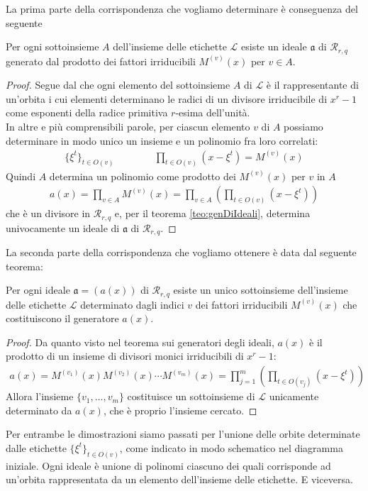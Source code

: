 \vspace{0.6cm}

\noindent
La prima parte della corrispondenza che vogliamo determinare è conseguenza del seguente
\begin{teorema}\label{teo:corrispEtiIde1}
   Per ogni sottoinsieme $A$ dell'insieme delle etichette $\mathscr{L}$ esiste un ideale $\mathfrak{a}$ di $\mathcal{R}_{r,q}$ generato dal prodotto dei fattori irriducibili $M^{(v)}(x)$ per $v\in A$.
\end{teorema}
\begin{proof}
   Segue dal che ogni elemento del sottoinsieme $A$ di $\mathscr{L}$ è il rappresentante di un'orbita i cui elementi determinano le radici di un divisore irriducibile di $x^r - 1$ come esponenti della radice primitiva $r$-esima dell'unità.\\
   In altre e più comprensibili parole, per ciascun elemento $v$ di $A$ possiamo determinare in modo unico un insieme e un polinomio fra loro correlati:
   \begin{align*}
      \lbrace \xi^{t} \rbrace_{t \in O(v)} \qquad \qquad \prod_{t \in O(v)} (x - \xi^{t}) = M^{(v)}(x)
   \end{align*}
   Quindi $A$ determina un polinomio come prodotto dei $M^{(v)}(x)$ per $v$ in $A$
   \begin{align*}
      a(x) = \prod_{v\in A} M^{(v)}(x) = \prod_{v\in A} (  \prod_{t \in O(v)} (x - \xi^{t}) )
   \end{align*}
   che è un divisore in $\mathcal{R}_{r,q} $ e, per il teorema \ref{teo:genDiIdeali}, determina univocamente un ideale di $\mathfrak{a}$ di $\mathcal{R}_{r,q}$. 
\end{proof}
\noindent
La seconda parte della corrispondenza che vogliamo ottenere è data dal seguente teorema:
\begin{teorema}\label{teo:corrispEtiIde2}
   Per ogni ideale $\mathfrak{a} = (a(x))$ di $\mathcal{R}_{r,q}$ esiste un unico sottoinsieme dell'insieme delle etichette $\mathscr{L}$ determinato dagli indici $v$ dei fattori irriducibili $M^{(v)}(x)$ che costituiscono il generatore $a(x)$.
\end{teorema}
\begin{proof}
   Da quanto visto nel teorema sui generatori degli ideali, $a(x)$ è il prodotto di un insieme di divisori monici irriducibili di $x^r - 1$:
   \begin{align*}
      a(x) =  M^{(v_{1})}(x) M^{(v_{2})}(x) \cdots M^{(v_{m})}(x) = \prod_{j=1}^{m} (  \prod_{t \in O(v_{j})} (x - \xi^{t}) )
   \end{align*}
   Allora l'insieme $ \lbrace v_{1}, \dots , v_{m} \rbrace$ costituisce un sottoinsieme di $\mathscr{L}$ unicamente determinato da $a(x) $, che è proprio l'insieme cercato.
\end{proof}
\noindent
Per entrambe le dimostrazioni siamo passati per l'unione delle orbite determinate dalle etichette $\lbrace \xi^{t} \rbrace_{t \in O(v)}$, come indicato in modo schematico nel diagramma iniziale. Ogni ideale è unione di polinomi ciascuno dei quali corrisponde ad un'orbita rappresentata da un elemento dell'insieme delle etichette. E viceversa. 

